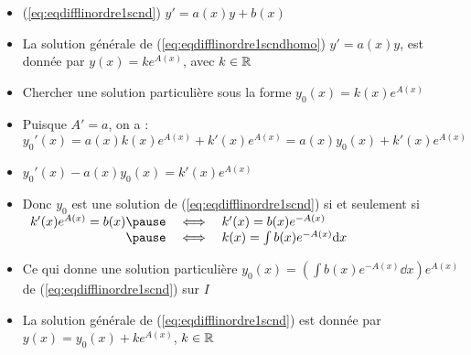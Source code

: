 \begin{frame}


 \pause
\begin{itemize}

  \item (\ref{eq:eqdifflinordre1scnd}) $y' = a(x) y  + b(x)$
   \pause
  \item La solution générale de (\ref{eq:eqdifflinordre1scndhomo}) 
  $y' = a(x) y$, est donnée par $y(x)=ke^{A(x)}$, avec $k\in \mathbb{R}$
   \pause
  \item Chercher une solution particulière sous la 
  forme $y_0(x)=k(x)e^{A(x)}$
   \pause
  \item Puisque $A'=a$, on a : 
  $y_0'(x)=a(x)k(x)e^{A(x)} + k'(x)e^{A(x)}= a(x)y_0(x) + k'(x)e^{A(x)}$
   \pause  
  \item $y_0'(x) - a(x)y_0(x) = k'(x)e^{A(x)}$ 
   \pause
  \item Donc $y_0$ est une solution de (\ref{eq:eqdifflinordre1scnd}) si
  et seulement si
 $\begin{array}{rcl}
 k'(x)e^{A(x)}=b(x) 
    \pause&\iff& k'(x)=b(x)e^{-A(x)} \\
    \pause&\iff& k(x)=\int b(x)e^{-A(x)}\dd x
 \end{array}$
  \pause
 \item Ce qui donne une solution particulière 
$y_0(x) = \left(\int b(x)e^{-A(x)}\dd x \right)e^{A(x)}$ de (\ref{eq:eqdifflinordre1scnd}) 
sur $I$
 \pause
  \item La solution générale de (\ref{eq:eqdifflinordre1scnd}) 
  est donnée par $y(x) = y_0(x) + ke^{A(x)}$, $k\in \mathbb{R}$
\end{itemize}

\end{frame}


